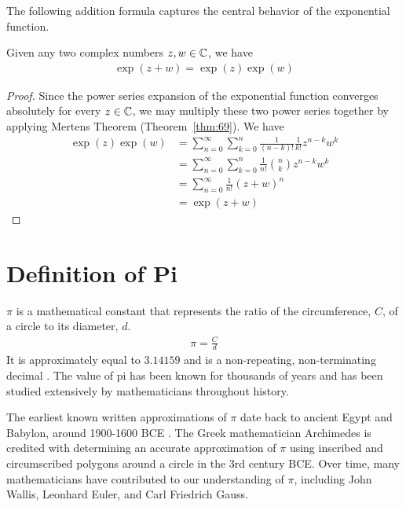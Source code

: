 \documentclass[thmcnt=section, 12pt]{my-elegantbook}
\begin{document}
The following addition formula 
captures the central behavior of 
the exponential function.

\begin{theorem} \label{thm:68}
    Given any two complex numbers $z, w \in \mathbb{C}$, we have 
	 \begin{align*}
	    \exp(z + w) = \exp(z) \exp(w)
	\end{align*}
\end{theorem}

\begin{proof}
	Since the power series expansion of the exponential function
	converges absolutely for every $z \in \mathbb{C}$, 
	we may multiply these two power series together
	by applying Mertens Theorem (Theorem~\ref{thm:69}).
	We have
	\begin{align*}
	    \exp(z) \exp(w)
		&= \sum_{n=0}^\infty \sum_{k=0}^n
		\frac{1}{(n-k)!} \frac{1}{k!} z^{n-k} w^k \\
		&= \sum_{n=0}^\infty \sum_{k=0}^n
		\frac{1}{n!} \binom{n}{k} z^{n-k} w^k \\
		&= \sum_{n=0}^\infty 
		\frac{1}{n!} (z+w)^n \\
		&= \exp(z+w)
	\end{align*}
\end{proof}


\section{Definition of Pi}

$\pi$ is a mathematical constant 
that represents the ratio of the circumference, $C$, 
of a circle to its diameter, $d$.
\begin{align}
	\pi = \frac{C}{d}
	\label{eq:152}
\end{align}
It is approximately equal to $3.14159$ 
and is a non-repeating, 
non-terminating decimal \cite{weissteinPi}. 
The value of pi has been known for thousands of years and has been studied extensively by mathematicians throughout history.

The earliest known written approximations of $\pi$ 
date back to ancient Egypt and Babylon, 
around 1900-1600 BCE \cite{gouldHistoryPi1974}.
The Greek mathematician Archimedes is credited 
with determining an accurate approximation of $\pi$ 
using inscribed and circumscribed polygons 
around a circle in the 3rd century BCE.
Over time, many mathematicians have contributed to 
our understanding of $\pi$, 
including John Wallis, Leonhard Euler, and Carl Friedrich Gauss.
\end{document}
